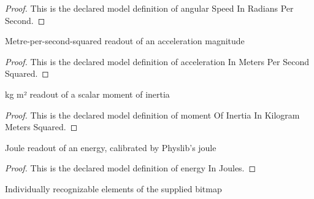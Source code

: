 \begin{proof}
  This is the declared model definition of angular Speed In Radians Per Second.
\end{proof}
\begin{definition}
  \label{def:physics:phyx-mini-0821:phyxminiproblems-problemphyxmini0821-accelerationinmeterspersecondsquared}
  Metre-per-second-squared readout of an acceleration magnitude
\end{definition}
\begin{proof}
  This is the declared model definition of acceleration In Meters Per Second Squared.
\end{proof}
\begin{definition}
  \label{def:physics:phyx-mini-0821:phyxminiproblems-problemphyxmini0821-momentofinertiainkilogrammeterssquared}
  kg m² readout of a scalar moment of inertia
\end{definition}
\begin{proof}
  This is the declared model definition of moment Of Inertia In Kilogram Meters Squared.
\end{proof}
\begin{definition}
  \label{def:physics:phyx-mini-0821:phyxminiproblems-problemphyxmini0821-energyinjoules}
  Joule readout of an energy, calibrated by Physlib's joule
\end{definition}
\begin{proof}
  This is the declared model definition of energy In Joules.
\end{proof}
\begin{definition}
  \label{def:physics:phyx-mini-0821:phyxminiproblems-problemphyxmini0821-figureelement}
  Individually recognizable elements of the supplied bitmap
\end{definition}
